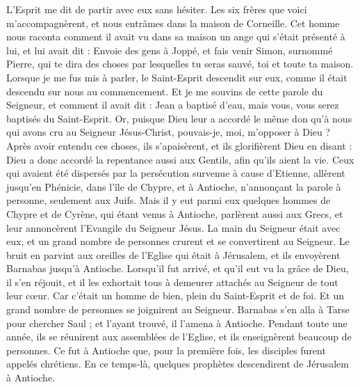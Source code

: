\begin{multicols}{2}
L’Esprit me dit de partir avec eux sans hésiter. Les six frères que voici m’accompagnèrent, et nous entrâmes dans la maison de Corneille.
Cet homme nous raconta comment il avait vu dans sa maison un ange qui s'était présenté à lui, et lui avait dit : Envoie des gens à Joppé, et fais venir Simon, surnommé Pierre,
qui te dira des choses par lesquelles tu seras sauvé, toi et toute ta maison.
Lorsque je me fus mis à parler, le Saint-Esprit descendit sur eux, comme il était descendu sur nous au commencement.
Et je me souvins de cette parole du Seigneur, et comment il avait dit : Jean a baptisé d'eau, mais vous, vous serez baptisés du Saint-Esprit.
Or, puisque Dieu leur a accordé le même don qu'à nous qui avons cru au Seigneur Jésus-Christ, pouvais-je, moi, m'opposer à Dieu ?
Après avoir entendu ces choses, ils s'apaisèrent, et ils glorifièrent Dieu en disant : Dieu a donc accordé la repentance aussi aux Gentils, afin qu’ils aient la vie.
Ceux qui avaient été dispersés par la persécution survenue à cause d'Etienne, allèrent jusqu'en Phénicie, dans l’île de Chypre, et à Antioche, n’annonçant la parole à personne, seulement aux Juifs.
Mais il y eut parmi eux quelques hommes de Chypre et de Cyrène, qui étant venus à Antioche, parlèrent aussi aux Grecs, et leur annoncèrent l’Evangile du Seigneur Jésus.
La main du Seigneur était avec eux, et un grand nombre de personnes crurent et se convertirent au Seigneur.
Le bruit en parvint aux oreilles de l'Eglise qui était à Jérusalem, et ils envoyèrent Barnabas jusqu’à Antioche.
Lorsqu’il fut arrivé, et qu’il eut vu la grâce de Dieu, il s'en réjouit, et il les exhortait tous à demeurer attachés au Seigneur de tout leur cœur.
Car c’était un homme de bien, plein du Saint-Esprit et de foi. Et un grand nombre de personnes se joignirent au Seigneur.
Barnabas s'en alla à Tarse pour chercher Saul ;
et l'ayant trouvé, il l’amena à Antioche. Pendant toute une année, ils se réunirent aux assemblées de l’Eglise, et ils enseignèrent beaucoup de personnes. Ce fut à Antioche que, pour la première fois, les disciples furent appelés chrétiens.
En ce temps-là, quelques prophètes descendirent de Jérusalem à Antioche.

\end{multicols}
